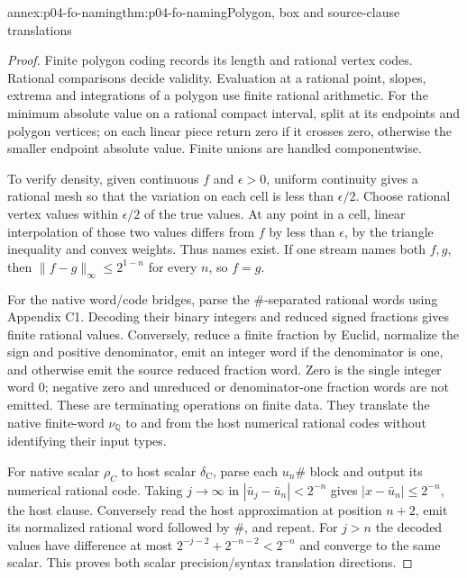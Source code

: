 
\begin{annexitem}{annex:p04-fo-naming}{thm:p04-fo-naming}{Polygon, box and source-clause translations}
\begin{proof}
Finite polygon coding records its length and rational vertex codes.
Rational comparisons decide validity. Evaluation at a rational point,
slopes, extrema and integrations of a polygon use finite rational
arithmetic. For the minimum absolute value on a rational compact
interval, split at its endpoints and polygon vertices; on each
linear piece return zero if it crosses zero, otherwise the smaller
endpoint absolute value. Finite unions are handled componentwise.

To verify density, given continuous \(f\) and \(\epsilon>0\),
uniform continuity gives a rational mesh so that the variation on
each cell is less than \(\epsilon/2\). Choose rational vertex values
within \(\epsilon/2\) of the true values. At any point in a cell,
linear interpolation of those two values differs from \(f\)
by less than \(\epsilon\), by the triangle inequality and convex
weights. Thus names exist. If one stream names both \(f,g\), then
\(\lVert f-g\rVert_\infty\leq2^{1-n}\) for every \(n\), so \(f=g\).

For the native word/code bridges, parse the \(\#\)-separated
rational words using Appendix C1. Decoding their binary integers
and reduced signed fractions gives finite rational values.
Conversely, reduce a finite fraction by Euclid, normalize the
sign and positive denominator, emit an integer word if the
denominator is one, and otherwise emit the source reduced
fraction word. Zero is the single integer word \(0\);
negative zero and unreduced or denominator-one fraction words
are not emitted. These are terminating operations on finite
data. They translate the native finite-word \(\nu_{\mathbb Q}\)
to and from the host numerical rational codes without
identifying their input types.

For native scalar \(\rho_C\) to host scalar
\(\delta_{\mathrm C}\), parse each \(u_n\#\) block and output
its numerical rational code. Taking \(j\to\infty\) in
\(|\bar u_j-\bar u_n|<2^{-n}\) gives
\(|x-\bar u_n|\leq2^{-n}\), the host clause.
Conversely read the host approximation at position \(n+2\),
emit its normalized rational word followed by \(\#\), and
repeat. For \(j>n\) the decoded values have difference
at most \(2^{-j-2}+2^{-n-2}<2^{-n}\) and converge to the
same scalar. This proves both scalar precision/syntax
translation directions.


\end{proof}
\end{annexitem}
